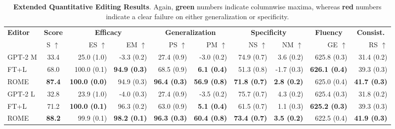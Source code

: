 \documentclass{article}
\newcommand{\badmetric}[1]{{\color{rred} \textbf{#1}}}
\newcommand{\goodmetric}[1]{{\color{ggreen} \textbf{#1}}}
\begin{document}
\begin{appendices}
\begin{table}[!t]
    \centering
    \tiny
    \caption{\small \textbf{Extended Quantitative Editing Results}. Again, \goodmetric{green} numbers indicate columnwise maxima, whereas \badmetric{red} numbers indicate a clear failure on either generalization or specificity.}
    \label{tab:cf-results-mini}
    \begin{adjustbox}{width=1\textwidth}
    \begin{tabular}{lcrrrrrrrr}
    \toprule
        \multirow{2.5}{*}{\textbf{Editor}} & \multicolumn{1}{c}{\textbf{Score}} & \multicolumn{2}{c}{\textbf{Efficacy}} & \multicolumn{2}{c}{\textbf{Generalization}} & \multicolumn{2}{c}{\textbf{Specificity}} & \multicolumn{1}{c}{\textbf{Fluency}} & \multicolumn{1}{c}{\textbf{Consist.}} \\
        \cmidrule(lr){2-2}\cmidrule(lr){3-4}\cmidrule(lr){5-6}\cmidrule(lr){7-8}\cmidrule(lr){9-9}\cmidrule(lr){10-10}
        & S $\uparrow$ & ES $\uparrow$ & EM $\uparrow$ & PS $\uparrow$ & PM $\uparrow$ & NS $\uparrow$ & NM $\uparrow$ & GE $\uparrow$ & RS $\uparrow$ \\
        \midrule
GPT-2 M & 33.4 & 25.0 (1.0) & -3.3 (0.2) & 27.4 (0.9) & -3.0 (0.2) & 74.9 (0.7) & 3.6 (0.2) & 625.8 (0.3) & 31.4 (0.2)\\\midrule
FT+L & 68.0 & 100.0 (0.1) & \goodmetric{94.9 (0.3)} & 68.5 (0.9) & \badmetric{6.1 (0.4)} & 51.3 (0.8) & -1.7 (0.3) & \goodmetric{626.1 (0.4)} & 39.3 (0.3)\\
ROME & \goodmetric{87.4} & \goodmetric{100.0 (0.0)} & 94.9 (0.3) & \goodmetric{96.4 (0.3)} & \goodmetric{56.9 (0.8)} & \goodmetric{71.8 (0.7)} & \goodmetric{2.8 (0.2)} & 625.0 (0.4) & \goodmetric{41.7 (0.3)}\\
\midrule\midrule
GPT-2 L & 32.8 & 23.9 (1.0) & -4.0 (0.3) & 27.4 (0.9) & -3.5 (0.2) & 75.7 (0.7) & 4.3 (0.2) & 625.4 (0.3) & 31.8 (0.2)\\\midrule
FT+L & 71.2 & \goodmetric{100.0 (0.1)} & 96.3 (0.2) & 63.0 (0.9) & \badmetric{5.1 (0.4)} & 61.5 (0.7) & 1.1 (0.3) & \goodmetric{625.2 (0.3)} & 39.3 (0.3)\\
ROME & \goodmetric{88.2} & 99.9 (0.1) & \goodmetric{98.2 (0.1)} & \goodmetric{96.3 (0.3)} & \goodmetric{60.4 (0.8)} & \goodmetric{73.4 (0.7)} & \goodmetric{3.5 (0.2)} & 622.5 (0.4) & \goodmetric{41.9 (0.3)}\\
    \bottomrule
    \end{tabular}
    \end{adjustbox}
\end{table}%


\end{appendices}
\end{document}
